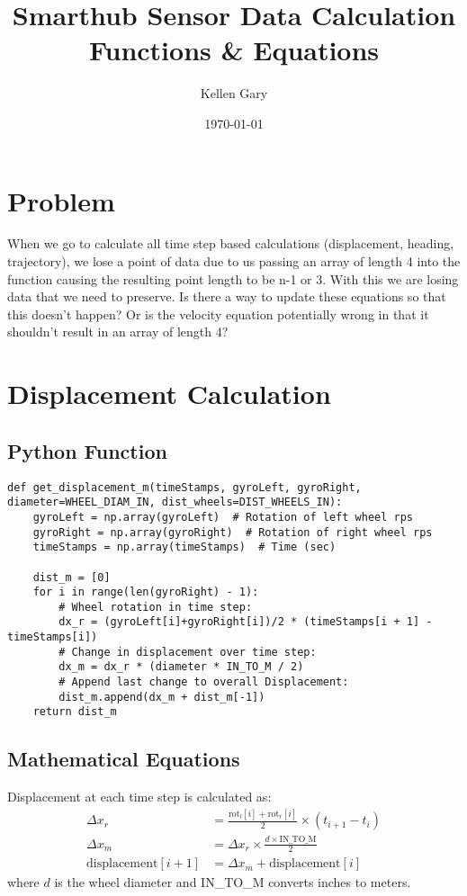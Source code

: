 \documentclass{article}
\title{Smarthub Sensor Data Calculation Functions \& Equations}
\author{Kellen Gary}
\date{\today}
\begin{document}
\maketitle

\section*{Problem}
When we go to calculate all time step based calculations (displacement, heading, trajectory), we lose a point of data due to us passing an array of length 4 into the function causing the resulting point length to be n-1 or 3. With this we are losing data that we need to preserve. Is there a way to update these equations so that this doesn't happen? Or is the velocity equation potentially wrong in that it shouldn't result in an array of length 4?

\section{Displacement Calculation}

\subsection{Python Function}
\begin{lstlisting}
def get_displacement_m(timeStamps, gyroLeft, gyroRight, diameter=WHEEL_DIAM_IN, dist_wheels=DIST_WHEELS_IN):
    gyroLeft = np.array(gyroLeft)  # Rotation of left wheel rps
    gyroRight = np.array(gyroRight)  # Rotation of right wheel rps
    timeStamps = np.array(timeStamps)  # Time (sec)

    dist_m = [0]
    for i in range(len(gyroRight) - 1):
        # Wheel rotation in time step:
        dx_r = (gyroLeft[i]+gyroRight[i])/2 * (timeStamps[i + 1] - timeStamps[i])
        # Change in displacement over time step:
        dx_m = dx_r * (diameter * IN_TO_M / 2)
        # Append last change to overall Displacement:
        dist_m.append(dx_m + dist_m[-1])
    return dist_m
\end{lstlisting}

\subsection{Mathematical Equations}
Displacement at each time step is calculated as:
\begin{align*}
\Delta x_r &= \frac{\text{rot}_l[i] + \text{rot}_r[i]}{2} \times (t_{i+1} - t_i) \\
\Delta x_m &= \Delta x_r \times \frac{d \times \text{IN\_TO\_M}}{2} \\
\text{displacement}[i+1] &= \Delta x_m + \text{displacement}[i]
\end{align*}
where $d$ is the wheel diameter and IN\_TO\_M converts inches to meters.
\end{document}
